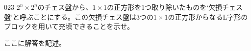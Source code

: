 \begin{thm}{023}{}{}
 $2^n\times2^n$のチェス盤から、$1\times1$の正方形を1つ取り除いたものを`欠損チェス盤'と呼ぶことにする。この欠損チェス盤は3つの$1\times1$の正方形からなるL字形のブロックを用いて充填できることを示せ。
\end{thm}

ここに解答を記述。